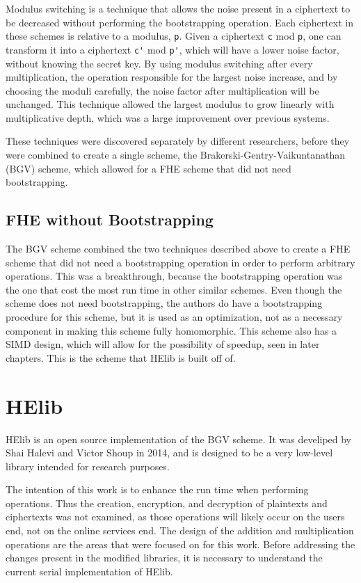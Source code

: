 Modulus switching \cite{coron2012public} is a technique that allows the noise present in a ciphertext to be decreased without performing the bootstrapping operation. Each ciphertext in these schemes is relative to a modulus, \verb|p|. Given a ciphertext \verb|c| mod \verb|p|, one can transform it into a ciphertext \verb|c'| mod \verb|p'|, which will have a lower noise factor, without knowing the secret key. By using modulus switching after every multiplication, the operation responsible for the largest noise increase, and by choosing the moduli carefully, the noise factor after multiplication will be unchanged. This technique allowed the largest modulus to grow linearly with multiplicative depth, which was a large improvement over previous systems.

These techniques were discovered separately by different researchers, before they were combined to create a single scheme, the Brakerski-Gentry-Vaikuntanathan (BGV) scheme, which allowed for a FHE scheme that did not need bootstrapping.

\subsection{FHE without Bootstrapping}
The BGV scheme \cite{cryptoeprint:2011:277} combined the two techniques described above to create a FHE scheme that did not need a bootstrapping operation in order to perform arbitrary operations. This was a breakthrough, because the bootstrapping operation was the one that cost the most run time in other similar schemes. Even though the scheme does not need bootstrapping, the authors do have a bootstrapping procedure for this scheme, but it is used as an optimization, not as a necessary component in making this scheme fully homomorphic. This scheme also has a SIMD design, which will allow for the possibility of speedup, seen in later chapters. This is the scheme that HElib is built off of.

\section{HElib}
HElib \cite{cryptoeprint:2014:106, cryptoeprint:2014:873, halevi2013design} is an open source implementation of the BGV scheme. It was develiped by Shai Halevi and Victor Shoup in 2014, and is designed to be a very low-level library intended for research purposes. 

The intention of this work is to enhance the run time when performing operations. Thus the creation, encryption, and decryption of plaintexts and ciphertexts was not examined, as those operations will likely occur on the users end, not on the online services end. The design of the addition and multiplication operations are the areas that were focused on for this work. Before addressing the changes present in the modified libraries, it is necessary to understand the current serial implementation of HElib. 

